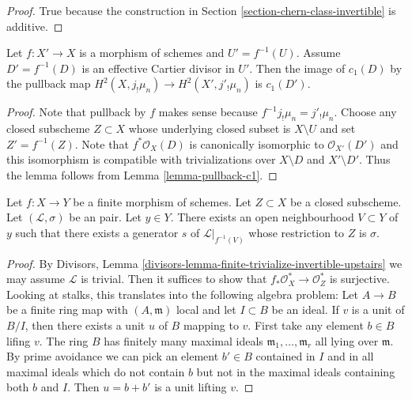 \begin{proof}
True because the construction in Section \ref{section-chern-class-invertible}
is additive.
\end{proof}

\begin{lemma}
\label{lemma-pullback-c1D}
Let $f : X' \to X$ is a morphism of schemes and $U' = f^{-1}(U)$.
Assume $D' = f^{-1}(D)$ is an effective Cartier divisor in $U'$.
Then the image of $c_1(D)$ by the pullback map
$H^2(X, j_!\mu_n) \to H^2(X', j'_!\mu_n)$ is $c_1(D')$.
\end{lemma}

\begin{proof}
Note that pullback by $f$ makes sense
because $f^{-1}j_!\mu_n = j'_!\mu_n$.
Choose any closed subscheme $Z \subset X$ 
whose underlying closed subset is $X \setminus U$
and set $Z' = f^{-1}(Z)$. Note that $f^*\mathcal{O}_X(D)$
is canonically isomorphic to $\mathcal{O}_{X'}(D')$
and this isomorphism is compatible with trivializations over
$X \setminus D$ and $X' \setminus D'$. Thus the lemma
follows from Lemma \ref{lemma-pullback-c1}.
\end{proof}

\begin{lemma}
\label{lemma-finite-trivialize-invertible-upstairs-restricts-to-1}
Let $f : X \to Y$ be a finite morphism of schemes. Let $Z \subset X$
be a closed subscheme. Let $(\mathcal{L}, \sigma)$ be an pair.
Let $y \in Y$. There exists an open neighbourhood
$V \subset Y$ of $y$ such that there exists a generator
$s$ of $\mathcal{L}|_{f^{-1}(V)}$ whose restriction to $Z$ is $\sigma$.
\end{lemma}

\begin{proof}
By Divisors, Lemma \ref{divisors-lemma-finite-trivialize-invertible-upstairs}
we may assume $\mathcal{L}$ is trivial. Then it suffices to show
that $f_*\mathcal{O}_X^* \to \mathcal{O}_Z^*$ is surjective.
Looking at stalks, this translates into the following algebra problem:
Let $A \to B$ be a finite ring map with $(A, \mathfrak m)$ local
and let $I \subset B$ be an ideal. If $v$ is a unit of $B/I$, then there
exists a unit $u$ of $B$ mapping to $v$. First take any element $b \in B$
lifing $v$. The ring $B$ has finitely many maximal ideals
$\mathfrak m_1, \ldots, \mathfrak m_r$ all lying over
$\mathfrak m$. By prime avoidance we can pick an element $b' \in B$
contained in $I$ and in all maximal ideals which do not contain $b$ but
not in the maximal ideals containing both $b$ and $I$. Then
$u = b + b'$ is a unit lifting $v$.
\end{proof}

